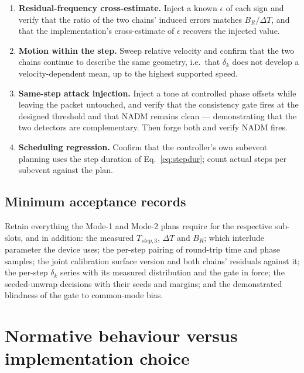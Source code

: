 \documentclass[11pt,a4paper]{article}
\newcommand{\NADM}{\mathrm{NADM}}
\begin{document}
\begin{enumerate}[leftmargin=1.7em,itemsep=2pt]
    $\delta_k$ does \emph{not} move --- demonstrating, and documenting, that the gate does not detect
    common-mode calibration error.
  \item \textbf{Residual-frequency cross-estimate.} Inject a known $\epsilon$ of each sign and verify
    that the ratio of the two chains' induced errors matches $B_R/\Delta T$, and that the
    implementation's cross-estimate of $\epsilon$ recovers the injected value.
  \item \textbf{Motion within the step.} Sweep relative velocity and confirm that the two chains
    continue to describe the same geometry, i.e.\ that $\delta_k$ does not develop a velocity-dependent
    mean, up to the highest supported speed.
  \item \textbf{Same-step attack injection.} Inject a tone at controlled phase offsets while leaving
    the packet untouched, and verify that the consistency gate fires at the designed threshold and
    that $\NADM$ remains clean --- demonstrating that the two detectors are complementary. Then forge
    both and verify $\NADM$ fires.
  \item \textbf{Scheduling regression.} Confirm that the controller's own subevent planning uses the
    step duration of Eq.~\eqref{eq:stepdur}; count actual steps per subevent against the plan.
\end{enumerate}

\subsection{Minimum acceptance records}

Retain everything the Mode-1 and Mode-2 plans require for the respective sub-slots, and in addition:
the measured $T_{step,3}$, $\Delta T$ and $B_R$; which interlude parameter the device uses; the
per-step pairing of round-trip time and phase samples; the joint calibration surface version and both
chains' residuals against it; the per-step $\delta_k$ series with its measured distribution and the
gate in force; the seeded-unwrap decisions with their seeds and margins; and the demonstrated
blindness of the gate to common-mode bias.

\section{Normative behaviour versus implementation choice}
\end{document}
